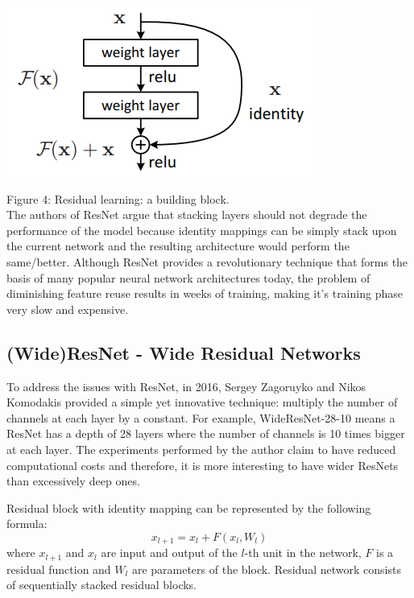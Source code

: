 \documentclass[conference]{IEEEtran}
\begin{document}
\begin{center}
    \includegraphics[scale=0.7]{ResNet.PNG}\\
\end{center}
Figure 4: Residual learning: a building block. \cite{8}\\

The authors of ResNet argue that stacking layers should not degrade the performance of the model because identity mappings can be simply stack upon the current network and the resulting architecture would perform the same/better. Although ResNet provides a revolutionary technique that forms the basis of many popular neural network architectures today, the problem of diminishing feature reuse results in weeks of training, making it's training phase very slow and expensive.

\subsection{\textbf{(Wide)ResNet - Wide Residual Networks}}
To address the issues with ResNet, in 2016, Sergey Zagoruyko and Nikos Komodakis provided a simple yet innovative technique: multiply the number of channels at each layer by a constant. For example, WideResNet-28-10 means a ResNet has a depth of 28 layers where the number of channels is 10 times bigger at each layer. The experiments performed by the author claim to have reduced computational costs and therefore, it is more interesting to have wider ResNets than excessively deep ones.

Residual block with identity mapping can be represented by the following formula:
\[x_{l+1} = x_l +F(x_l,W_l)\]
where $x_{l+1}$ and $x_l$ are input and output of the $l$-th unit in the network, $F$ is a residual function and $W_l$ are parameters of the block. Residual network consists of sequentially stacked residual blocks. \cite{9}
\end{document}
